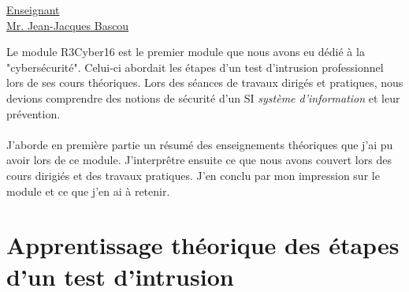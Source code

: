 \renewcommand{\figurename}{}

\vspace*{0.2cm}%
      \large
      \href{\@orientadorPagina}{\color{black}Enseignant\\Mr. Jean-Jacques Bascou}\\%
      \normalsize
\vspace*{0.5cm}%

Le module R3Cyber16 est le premier module que nous avons eu dédié à la "cybersécurité". Celui-ci abordait les étapes d'un test d'intrusion professionnel lors de ses cours théoriques. Lors des séances de travaux dirigés et pratiques, nous devions comprendre des notions de sécurité d'un SI \textit{système d'information} et leur prévention.
\\ \\
J'aborde en première partie un résumé des enseignements théoriques que j'ai pu avoir lors de ce module. J'interprêtre ensuite ce que nous avons couvert lors des cours dirigiés et des travaux pratiques. J'en conclu par mon impression sur le module et ce que j'en ai à retenir.

\section{Apprentissage théorique des étapes d'un test d'intrusion}

